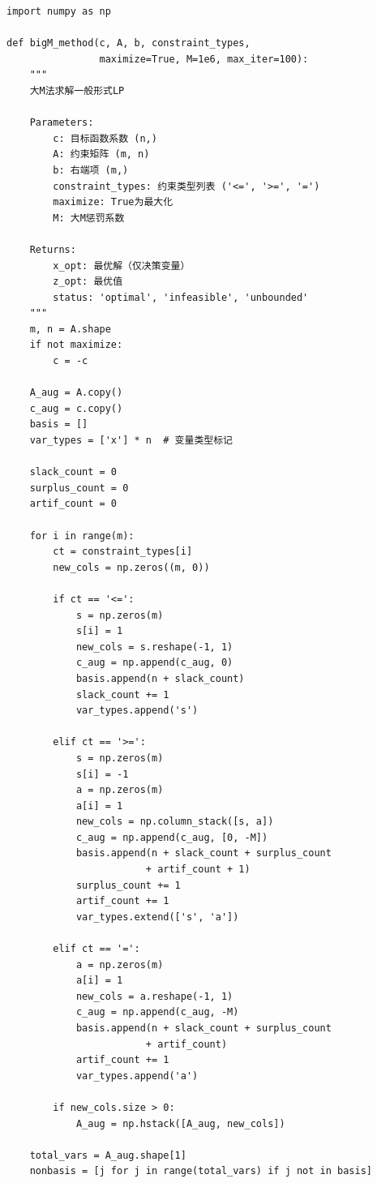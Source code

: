 \begin{codebox}[大M法实现]
\begin{lstlisting}
import numpy as np

def bigM_method(c, A, b, constraint_types,
                maximize=True, M=1e6, max_iter=100):
    """
    大M法求解一般形式LP
    
    Parameters:
        c: 目标函数系数 (n,)
        A: 约束矩阵 (m, n)
        b: 右端项 (m,)
        constraint_types: 约束类型列表 ('<=', '>=', '=')
        maximize: True为最大化
        M: 大M惩罚系数
    
    Returns:
        x_opt: 最优解（仅决策变量）
        z_opt: 最优值
        status: 'optimal', 'infeasible', 'unbounded'
    """
    m, n = A.shape
    if not maximize:
        c = -c
    
    A_aug = A.copy()
    c_aug = c.copy()
    basis = []
    var_types = ['x'] * n  # 变量类型标记
    
    slack_count = 0
    surplus_count = 0
    artif_count = 0
    
    for i in range(m):
        ct = constraint_types[i]
        new_cols = np.zeros((m, 0))
        
        if ct == '<=':
            s = np.zeros(m)
            s[i] = 1
            new_cols = s.reshape(-1, 1)
            c_aug = np.append(c_aug, 0)
            basis.append(n + slack_count)
            slack_count += 1
            var_types.append('s')
            
        elif ct == '>=':
            s = np.zeros(m)
            s[i] = -1
            a = np.zeros(m)
            a[i] = 1
            new_cols = np.column_stack([s, a])
            c_aug = np.append(c_aug, [0, -M])
            basis.append(n + slack_count + surplus_count
                        + artif_count + 1)
            surplus_count += 1
            artif_count += 1
            var_types.extend(['s', 'a'])
            
        elif ct == '=':
            a = np.zeros(m)
            a[i] = 1
            new_cols = a.reshape(-1, 1)
            c_aug = np.append(c_aug, -M)
            basis.append(n + slack_count + surplus_count
                        + artif_count)
            artif_count += 1
            var_types.append('a')
        
        if new_cols.size > 0:
            A_aug = np.hstack([A_aug, new_cols])
    
    total_vars = A_aug.shape[1]
    nonbasis = [j for j in range(total_vars) if j not in basis]
    

\end{lstlisting}
\end{codebox}
